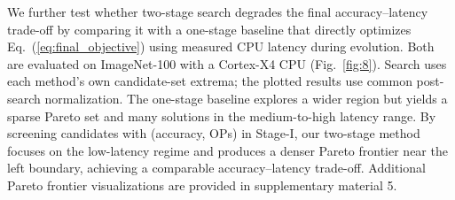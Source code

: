 \documentclass[a4paper,fleqn]{cas-sc}
\begin{document}
We further test whether two-stage search degrades the final accuracy--latency trade-off by comparing it with a one-stage baseline that directly optimizes Eq.~(\ref{eq:final_objective}) using measured CPU latency during evolution.
Both are evaluated on ImageNet-100 with a Cortex-X4 CPU (Fig.~\ref{fig:8}). Search uses each method's own candidate-set extrema; the plotted results use common post-search normalization.
The one-stage baseline explores a wider region but yields a sparse Pareto set and many solutions in the medium-to-high latency range.
By screening candidates with (accuracy, OPs) in Stage-I, our two-stage method focuses on the low-latency regime and produces a denser Pareto frontier near the left boundary, achieving a comparable accuracy--latency trade-off. Additional Pareto frontier visualizations are provided in supplementary material 5.
\end{document}
